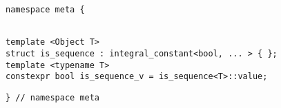 
\begin{verbatim}
namespace meta {
\end{verbatim}
\begin{verbatim}

template <Object T>
struct is_sequence : integral_constant<bool, ... > { };
template <typename T>
constexpr bool is_sequence_v = is_sequence<T>::value;

\end{verbatim}
\begin{verbatim}
} // namespace meta
\end{verbatim}
